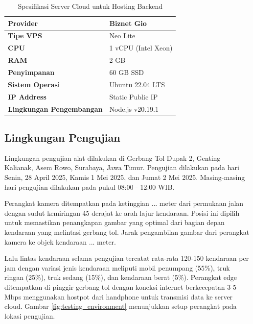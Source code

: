 \begin{table}[htbp]
  \centering
  \begin{tabular}{|l|l|}
  \hline
  \textbf{Provider} & Biznet Gio \\
  \hline
  \textbf{Tipe VPS} & Neo Lite \\
  \hline
  \textbf{CPU} & 1 vCPU (Intel Xeon) \\
  \hline
  \textbf{RAM} & 2 GB \\
  \hline
  \textbf{Penyimpanan} & 60 GB SSD \\
  \hline
  \textbf{Sistem Operasi} & Ubuntu 22.04 LTS \\
  \hline
  \textbf{IP Address} & Static Public IP \\
  \hline
  \textbf{Lingkungan Pengembangan} & Node.js v20.19.1  \\
  \hline
  \end{tabular}
  \caption{Spesifikasi Server Cloud untuk Hosting Backend}
  \label{tab:cloud_server_specs}
  \end{table}

\subsection{Lingkungan Pengujian}

Lingkungan pengujian alat dilakukan di Gerbang Tol Dupak 2, Genting Kalianak, Asem Rowo, Surabaya, Jawa Timur. Pengujian dilakukan pada hari Senin, 28 April 2025, Kamis 1 Mei 2025, dan Jumat 2 Mei 2025. Masing-masing hari pengujian dilakukan pada pukul 08:00 - 12:00 WIB. 

Perangkat kamera ditempatkan pada ketinggian ... meter dari permukaan jalan dengan sudut kemiringan 45 derajat ke arah lajur kendaraan. Posisi ini dipilih untuk memastikan penangkapan gambar yang optimal dari bagian depan kendaraan yang melintasi gerbang tol. Jarak pengambilan gambar dari perangkat kamera ke objek kendaraan ... meter.

Lalu lintas kendaraan selama pengujian tercatat rata-rata 120-150 kendaraan per jam dengan variasi jenis kendaraan meliputi mobil penumpang (55\%), truk ringan (25\%), truk sedang (15\%), dan kendaraan berat (5\%). Perangkat edge ditempatkan di pinggir gerbang tol dengan koneksi internet berkecepatan 3-5 Mbps menggunakan hostpot dari handphone untuk transmisi data ke server cloud. Gambar \ref{fig:testing_environment} menunjukkan setup perangkat pada lokasi pengujian.

